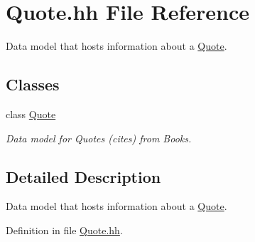 \hypertarget{_quote_8hh}{\section{Quote.\-hh File Reference}
\label{_quote_8hh}
}


Data model that hosts information about a \hyperlink{class_quote}{Quote}.  


\subsection*{Classes}
\begin{DoxyCompactItemize}
\item 
class \hyperlink{class_quote}{Quote}
\begin{DoxyCompactList}\small\item\em Data model for Quotes (cites) from Books. \end{DoxyCompactList}\end{DoxyCompactItemize}


\subsection{Detailed Description}
Data model that hosts information about a \hyperlink{class_quote}{Quote}. 

Definition in file \hyperlink{_quote_8hh_source}{Quote.\-hh}.

